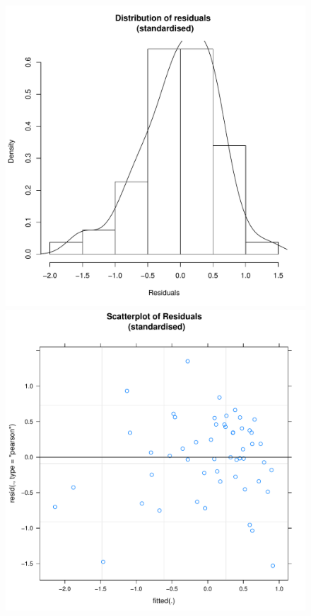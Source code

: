 \begin{CJK}{UTF8}{gbsn}


\begin{figure}[htbp]
    \includegraphics[scale =.4]{images/TEM1Hist.pdf}
    \includegraphics[scale =.4]{images/TEM1Scatter.pdf}

\end{figure}
\end{CJK}
